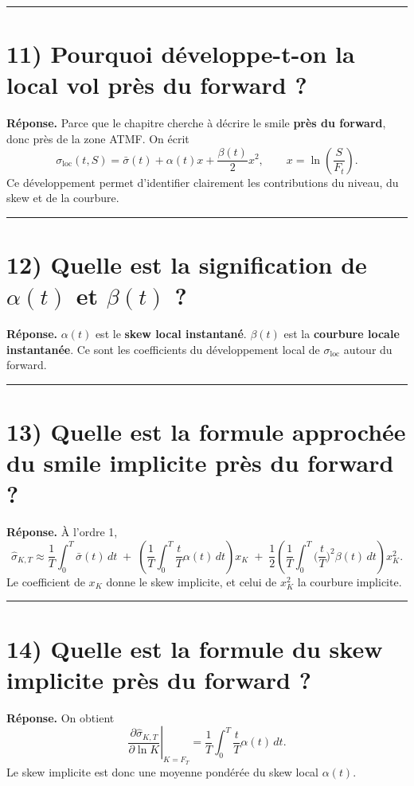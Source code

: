 \documentclass[11pt,a4paper]{article}
\begin{document}
\bigskip\hrule\bigskip

\section{11) Pourquoi développe-t-on la local vol près du forward ?}

\textbf{Réponse.}  
Parce que le chapitre cherche à décrire le smile \textbf{près du forward}, donc près de la zone ATMF.  
On écrit
\[
\sigma_{\mathrm{loc}}(t,S)=\bar{\sigma}(t)+\alpha(t)x+\frac{\beta(t)}{2}x^2,
\qquad
x=\ln\!\left(\frac{S}{F_t}\right).
\]
Ce développement permet d’identifier clairement les contributions du niveau, du skew et de la courbure.

\bigskip\hrule\bigskip

\section{12) Quelle est la signification de \(\alpha(t)\) et \(\beta(t)\) ?}

\textbf{Réponse.}  
\(\alpha(t)\) est le \textbf{skew local instantané}.  
\(\beta(t)\) est la \textbf{courbure locale instantanée}.  
Ce sont les coefficients du développement local de \(\sigma_{\mathrm{loc}}\) autour du forward.

\bigskip\hrule\bigskip

\section{13) Quelle est la formule approchée du smile implicite près du forward ?}

\textbf{Réponse.}  
À l’ordre 1,
\[
\hat{\sigma}_{K,T}
\approx
\frac{1}{T}\int_0^T \bar{\sigma}(t)\,dt
\;+\;
\left(
\frac{1}{T}\int_0^T \frac{t}{T}\alpha(t)\,dt
\right)x_K
\;+\;
\frac{1}{2}
\left(
\frac{1}{T}\int_0^T \Big(\frac{t}{T}\Big)^2\beta(t)\,dt
\right)x_K^2.
\]
Le coefficient de \(x_K\) donne le skew implicite, et celui de \(x_K^2\) la courbure implicite.

\bigskip\hrule\bigskip

\section{14) Quelle est la formule du skew implicite près du forward ?}

\textbf{Réponse.}  
On obtient
\[
\left.\frac{\partial \hat{\sigma}_{K,T}}{\partial \ln K}\right|_{K=F_T}
=
\frac{1}{T}\int_0^T \frac{t}{T}\alpha(t)\,dt.
\]
Le skew implicite est donc une moyenne pondérée du skew local \(\alpha(t)\).
\end{document}
